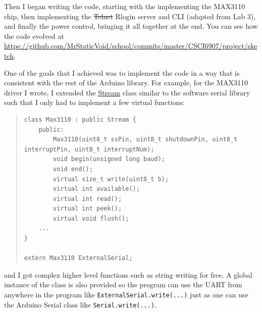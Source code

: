 \documentclass{amsart}
\begin{document}
Then I began writing the code, starting with the implementing the MAX3110 chip, then implementing the \sout{Telnet} Rlogin server and CLI (adapted from Lab 3), and finally the power control, bringing it all together at the end.  You can see how the code evolved at \url{https://github.com/MrStaticVoid/school/commits/master/CSCI6907/project/sketch}.

One of the goals that I achieved was to implement the code in a way that is consistent with the rest of the Arduino library.  For example, for the MAX3110 driver I wrote, I extended the \href{http://arduino.cc/en/Reference/Stream}{Stream} class similar to the software serial library such that I only had to implement a few virtual functions:

\begin{quote}
\lstset{language=C++,basicstyle=\footnotesize,breaklines=true}
\begin{lstlisting}
class Max3110 : public Stream {
    public:
        Max3110(uint8_t ssPin, uint8_t shutdownPin, uint8_t interruptPin, uint8_t interruptNum);
        void begin(unsigned long baud);
        void end();
        virtual size_t write(uint8_t b);
        virtual int available();
        virtual int read();
        virtual int peek();
        virtual void flush();
    ...
}

extern Max3110 ExternalSerial;
\end{lstlisting}
\end{quote}

and I got complex higher level functions such as string writing for free.  A global instance of the class is also provided so the program can use the UART from anywhere in the program like \texttt{ExternalSerial.write(...)} just as one can use the Arduino Serial class like \texttt{Serial.write(...)}.
\end{document}
